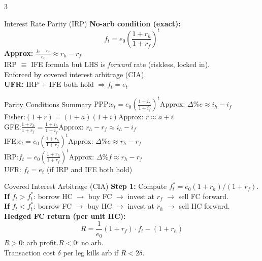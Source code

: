 \documentclass[7.5pt,a4paper]{article}
\newcommand{\dsp}{\displaystyle}
\newcommand{\rh}{r_{\!h}}
\newcommand{\rf}{r_{\!f}}
\newcommand{\ih}{i_h}
\newcommand{\iif}{i_f}          %
\newcommand{\kw}[1]{\textbf{#1}}
\begin{document}
\begin{multicols}{3}
\begin{fsect}{Interest Rate Parity (IRP)}
\kw{No-arb condition (exact):}
\[
  f_t = e_0\!\left(\frac{1+\rh}{1+\rf}\right)^{\!t}
\]
\kw{Approx:}\quad
$\dsp\frac{f_t-e_0}{e_0}\approx\rh-\rf$\\[2pt]
IRP $\equiv$ IFE formula but LHS is \textit{forward} rate (riskless, locked in).\\
Enforced by covered interest arbitrage (CIA).\\[2pt]
\kw{UFR:} IRP + IFE both hold $\Rightarrow f_t=e_t$
\end{fsect}

\columnbreak

\begin{fsect}{Parity Conditions Summary}
{\fontsize{6.0}{7.5}\selectfont\linespread{1}
PPP:\quad $e_t=e_0\!\left(\frac{1+\ih}{1+\iif}\right)^t$\quad Approx: $\Delta\%e\approx \ih{-}\iif$\\[2pt]
Fisher:\quad $(1+r)=(1+a)(1+i)$\quad Approx: $r\approx a{+}i$\\[2pt]
GFE:\quad $\frac{1+\rh}{1+\rf}=\frac{1+\ih}{1+\iif}$\quad Approx: $\rh{-}\rf\approx\ih{-}\iif$\\[2pt]
IFE:\quad $e_t=e_0\!\left(\frac{1+\rh}{1+\rf}\right)^t$\quad Approx: $\Delta\%e\approx\rh{-}\rf$\\[2pt]
IRP:\quad $f_t=e_0\!\left(\frac{1+\rh}{1+\rf}\right)^t$\quad Approx: $\Delta\%f\approx\rh{-}\rf$\\[2pt]
UFR: $f_t=e_t$ (if IRP and IFE both hold)
}
\end{fsect}

\begin{fsect}{Covered Interest Arbitrage (CIA)}
\kw{Step 1:} Compute $f_t^{*}=e_0(1+\rh)/(1+\rf)$.\\[1pt]
\kw{If} $f_t>f_t^{*}$:\; borrow HC $\to$ buy FC $\to$ invest at $\rf$ $\to$ sell FC forward.\\[1pt]
\kw{If} $f_t<f_t^{*}$:\; borrow FC $\to$ buy HC $\to$ invest at $\rh$ $\to$ sell HC forward.\\[1pt]
\kw{Hedged FC return (per unit HC):}
\[
  R = \frac{1}{e_0}(1+\rf)\cdot f_t - (1+\rh)
\]
$R>0$: arb profit.\quad $R<0$: no arb.\\
Transaction cost $\delta$ per leg kills arb if $R<2\delta$.
\end{fsect}


\end{multicols}
\end{document}
